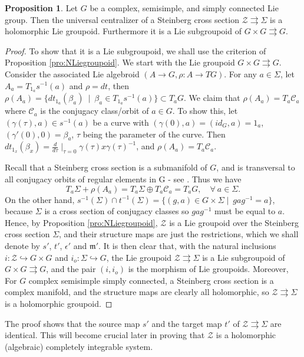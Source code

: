 \documentclass[a4paper,12pt,leqno]{amsart}
\numberwithin{equation}{section}
\theoremstyle{plain}
\theoremstyle{definition}
\newcommand{\cZ}{\mathcal{Z}}
\newcommand{\cC}{\mathcal{C}}
\newcommand{\fm}{\mathfrak{m}}
\newtheorem{pro}[thm]{Proposition}
\begin{document}
\begin{pro}\label{pro:universalgroupoid} Let $G$ be a complex, semisimple, and simply connected Lie group. Then the universal centralizer of a Steinberg cross section $\cZ\rightrightarrows \Sigma$ is a holomorphic Lie groupoid. Furthermore it is a Lie subgroupoid of $G\times G\rightrightarrows G$.
\end{pro}

\begin{proof}
To show that it is a Lie subgroupoid, we shall use the criterion of Proposition \ref{pro:NLiegroupoid}. We start with the Lie groupoid $G\times G \rightrightarrows G$. Consider the associated Lie algebroid $(A\rightarrow G,\rho:A\to TG)$. For any $a\in \Sigma$, let $A_a=T_{1_a}s^{-1}(a)$ and $\rho=dt$, then
$\rho(A_a)=\{dt_{1_a}(\beta_a)~\mid~\beta_a \in T_{1_a}s^{-1}(a)\}\subset T_a G$. We claim that $\rho(A_a)=T_a\cC_a$ where $\cC_a$ is the conjugacy class/orbit of $a\in G$. To show this, let $(\gamma(\tau),a) \in s^{-1}(a)$ be a curve with $(\gamma(0),a)=(id_G,a)=1_a$, $(\gamma'(0),0)=\beta_a$, $\tau$ being the parameter of the curve. Then
$dt_{1_x}(\beta_x)=\frac{d}{d\tau}\mid_{\tau=0}\gamma(\tau)x \gamma(\tau)^{-1}$, and $\rho(A_a)=T_a\cC_a$.

Recall that a Steinberg cross section is a submanifold of $G$, and is transversal to all conjugacy orbits of regular elements in G - see \cite{Se11}. Thus we have
\[T_a \Sigma+ \rho(A_a)=T_a\Sigma\oplus T_a\cC_a=T_a G,  \quad \forall ~a\in \Sigma. \]
On the other hand,
$s^{-1}(\Sigma)\cap t^{-1}(\Sigma)=\{(g,a)\in G\times \Sigma\mid~gag^{-1}=a\}$,
because $\Sigma$ is a cross section of conjugacy classes so $gag^{-1}$ must be equal to $a$.
Hence, by Proposition \ref{pro:NLiegroupoid}, $\cZ$ is a Lie groupoid over the Steinberg cross section $\Sigma$,
and their structure maps are just the restrictions, which we shall denote by $s'$, $t'$, $\epsilon'$ and $\fm'$.
It is then clear that, with the natural inclusions $i:\cZ \hookrightarrow G\times G$ and $i_o:\Sigma \hookrightarrow G$, the Lie groupoid $\cZ\rightrightarrows \Sigma$ is a Lie subgroupoid of $G\times G \rightrightarrows G$, and the pair $(i,i_o)$ is the morphism of Lie groupoids. Moreover, For $G$ complex semisimple simply connected, a Steinberg cross section is a complex manifold, and the structure maps are clearly all holomorphic, so $\cZ\rightrightarrows \Sigma$ is a holomorphic groupoid.
\end{proof}

The proof shows that the source map $s'$ and the target map $t'$ of $\cZ\rightrightarrows \Sigma$ are identical. This will become crucial later in proving that $\cZ$ is a holomorphic (algebraic) completely integrable system. 
\end{document}
